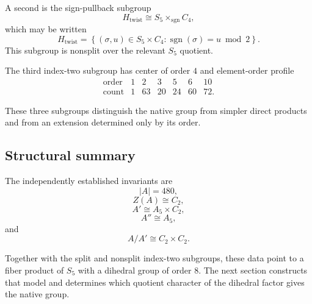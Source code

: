 A second is the sign-pullback subgroup
\[
H_{\mathrm{twist}}
\cong
S_5\times_{\operatorname{sgn}} C_4,
\]
which may be written
\[
H_{\mathrm{twist}}
=
\left\{
(\sigma,u)\in S_5\times C_4:
\operatorname{sgn}(\sigma)=u\bmod 2
\right\}.
\]
This subgroup is nonsplit over the relevant $S_5$ quotient.

The third index-two subgroup has center of order $4$ and element-order
profile
\[
\begin{array}{c|rrrrrrr}
\text{order}
&1&2&3&5&6&10\\
\hline
\text{count}
&1&63&20&24&60&72.
\end{array}
\]

These three subgroups distinguish the native group from simpler direct
products and from an extension determined only by its order.

\subsection{Structural summary}

The independently established invariants are
\[
|A|=480,
\]
\[
Z(A)\cong C_2,
\]
\[
A'\cong A_5\times C_2,
\]
\[
A''\cong A_5,
\]
and
\[
A/A'\cong C_2\times C_2.
\]

Together with the split and nonsplit index-two subgroups, these data
point to a fiber product of $S_5$ with a dihedral group of order $8$.
The next section constructs that model and determines which quotient
character of the dihedral factor gives the native group.
